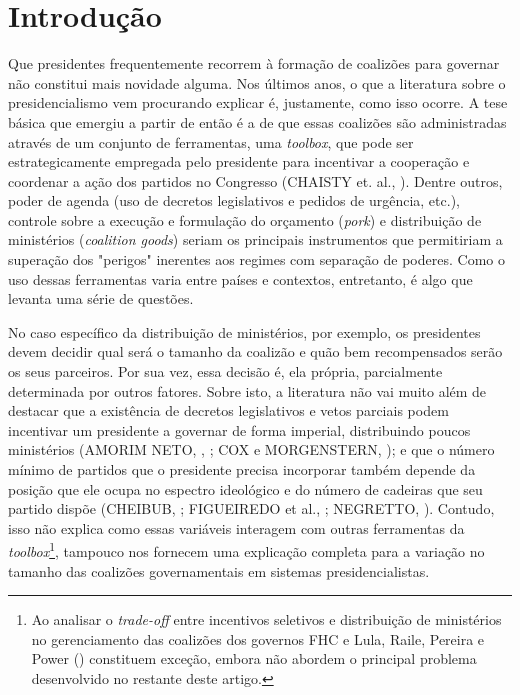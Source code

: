 \section{Introdução}
\label{sec:introduction}

Que presidentes frequentemente recorrem à formação de coalizões para governar não constitui mais novidade alguma. Nos últimos anos, o que a literatura sobre o presidencialismo vem procurando explicar é, justamente, como isso ocorre. A tese básica que emergiu a partir de então é a de que essas coalizões são administradas através de um conjunto de ferramentas, uma \textit{toolbox}, que pode ser estrategicamente empregada pelo presidente para incentivar a cooperação e coordenar a ação dos partidos no Congresso (CHAISTY et. al., \citeyear{chaisty2014}). Dentre outros, poder de agenda (uso de decretos legislativos e pedidos de urgência, etc.), controle sobre a execução e formulação do orçamento (\textit{pork}) e distribuição de ministérios (\textit{coalition goods}) seriam os principais instrumentos que permitiriam a superação dos "perigos"{} inerentes aos regimes com separação de poderes. Como o uso dessas ferramentas varia entre países e contextos, entretanto, é algo que levanta uma série de questões.

No caso específico da distribuição de ministérios, por exemplo, os presidentes devem decidir qual será o tamanho da coalizão e quão bem recompensados serão os seus parceiros. Por sua vez, essa decisão é, ela própria, parcialmente determinada por outros fatores. Sobre isto, a literatura não vai muito além de destacar que a existência de decretos legislativos e vetos parciais podem incentivar um presidente a governar de forma imperial, distribuindo poucos ministérios (AMORIM NETO,  \citeyear{neto2000}, \citeyear{neto2006}; COX e MORGENSTERN, \citeyear{cox2001}); e que o número mínimo de partidos que o presidente precisa incorporar também depende da posição que ele ocupa no espectro ideológico e do número de cadeiras que seu partido dispõe (CHEIBUB, \citeyear{cheibub2007}; FIGUEIREDO et al., \citeyear{figueiredo2012}; NEGRETTO, \citeyear{negretto2006}). Contudo, isso não explica como essas variáveis interagem com outras ferramentas da \textit{toolbox}\footnote{Ao analisar o \textit{trade-off} entre incentivos seletivos e distribuição de ministérios no gerenciamento das coalizões dos governos FHC e Lula, Raile, Pereira e Power (\citeyear{raile2010}) constituem exceção, embora não abordem o principal problema desenvolvido no restante deste artigo.}, tampouco nos fornecem uma explicação completa para a variação no tamanho das coalizões governamentais em sistemas presidencialistas.

